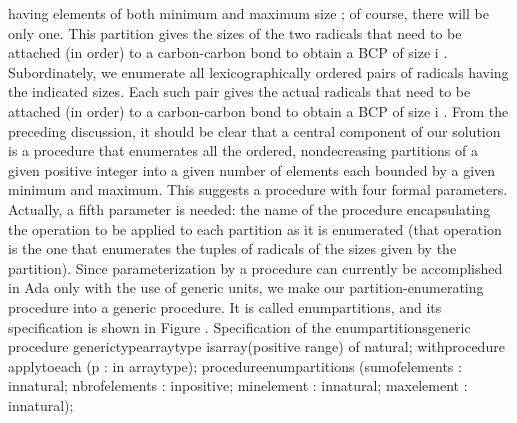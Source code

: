 \LmthEndeqn[]\EndInlEqn[] having elements of both minimum and maximum
size \InlEqn[]
\LmthEndeqn[]\EndInlEqn[]; of course, there will be only one. This
partition gives the sizes of the two radicals that need to be attached
(in order) to a carbon-carbon bond to obtain a BCP of size %
\InlEqn[]\LmthEqn[]i
\LmthEndeqn[]\EndInlEqn[]. Subordinately, we enumerate all lexicographically
ordered pairs of radicals having the indicated sizes. Each such pair
gives the actual radicals that need to be attached (in order) to a
carbon-carbon bond to obtain a BCP of size \InlEqn[]\LmthEqn[]i
\LmthEndeqn[]\EndInlEqn[].%
\Endpara[]
\Para[]From the preceding discussion, it should be clear that a central
component of our solution is a procedure that enumerates all the ordered,
nondecreasing partitions of a given positive integer into a given
number of elements each bounded by a given minimum and maximum. This
suggests a procedure with four formal parameters. Actually, a fifth
parameter is needed: the name of the procedure encapsulating the operation
to be applied to each partition as it is enumerated (that operation
is the one that enumerates the tuples of radicals of the sizes given
by the partition). Since parameterization by a procedure can currently
be accomplished in Ada only with the use of generic units, we make
our partition-enumerating procedure into a generic procedure. It is
called \tyxffmxmono[]enum\Symuns[]partitions\tyxffmxendmono[], and
its specification is shown in Figure .
\Parbox[]
Specification of the
\tyxffmxmono[]enum\Symuns[]partitions\tyxffmxendmono[] generic procedure%
\FgEndcap[]
\Comp[]\tyxtstxbf[]generic\tyxtstxendbf[]
   \tyxtstxbf[]type\tyxtstxendbf[] array\Symuns[]type %
\tyxtstxbf[]is\tyxtstxendbf[] \tyxtstxbf[]array\tyxtstxendbf[] (positive %
\tyxtstxbf[]range\tyxtstxendbf[] \Symlt[]\Symgt[]) \tyxtstxbf[]of%
\tyxtstxendbf[] natural;
   \tyxtstxbf[]with\tyxtstxendbf[] \tyxtstxbf[]procedure%
\tyxtstxendbf[] apply\Symuns[]to\Symuns[]each (p : \tyxtstxbf[]in%
\tyxtstxendbf[] array\Symuns[]type);
\tyxtstxbf[]procedure\tyxtstxendbf[] enum\Symuns[]partitions (sum\Symuns[]of\Symuns[]elements : %
\tyxtstxbf[]in\tyxtstxendbf[] natural;
                           nbr\Symuns[]of\Symuns[]elements : %
\tyxtstxbf[]in\tyxtstxendbf[] positive;
                           min\Symuns[]element     : %
\tyxtstxbf[]in\tyxtstxendbf[] natural;
                           max\Symuns[]element     : %
\tyxtstxbf[]in\tyxtstxendbf[] natural);\Endcomp[]
